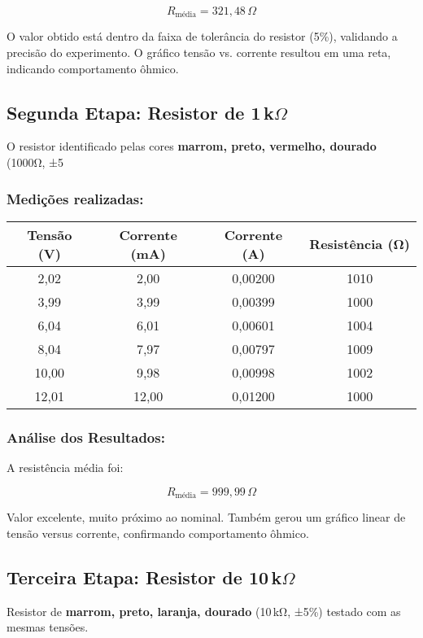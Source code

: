 \[
R_{\text{média}} = 321{,}48\,\Omega
\]

O valor obtido está dentro da faixa de tolerância do resistor (5\%), validando a precisão do experimento. O gráfico tensão vs. corrente resultou em uma reta, indicando comportamento ôhmico.

\subsection{Segunda Etapa: Resistor de 1\,k$\Omega$}
O resistor identificado pelas cores \textbf{marrom, preto, vermelho, dourado} (1000Ω, ±5%

\subsubsection{Medições realizadas:}

\begin{center}
\begin{tabular}{|c|c|c|c|}
\hline
\textbf{Tensão (V)} & \textbf{Corrente (mA)} & \textbf{Corrente (A)} & \textbf{Resistência (Ω)} \\
\hline
2,02 & 2,00 & 0,00200 & 1010 \\
3,99 & 3,99 & 0,00399 & 1000 \\
6,04 & 6,01 & 0,00601 & 1004 \\
8,04 & 7,97 & 0,00797 & 1009 \\
10,00 & 9,98 & 0,00998 & 1002 \\
12,01 & 12,00 & 0,01200 & 1000 \\
\hline
\end{tabular}
\end{center}

\subsubsection{Análise dos Resultados:}
A resistência média foi:

\[
R_{\text{média}} = 999{,}99\,\Omega
\]

Valor excelente, muito próximo ao nominal. Também gerou um gráfico linear de tensão versus corrente, confirmando comportamento ôhmico.

\vspace{0.5cm}

\subsection{Terceira Etapa: Resistor de 10\,k$\Omega$}
Resistor de \textbf{marrom, preto, laranja, dourado} (10\,kΩ, ±5\%) testado com as mesmas tensões.

